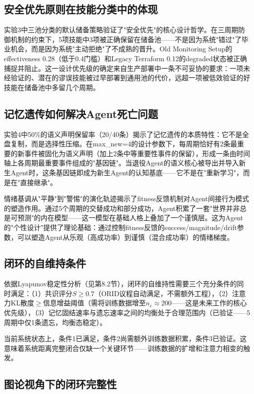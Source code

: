 \documentclass[12pt,a4paper]{ctexart}
\begin{document}
\subsection{安全优先原则在技能分类中的体现}

实验3中三池分类的默认储备策略验证了"安全优先"的核心设计哲学。在三周期防御机制的约束下，5项技能中3项被正确保留在储备池——不是因为系统"错过"了毕业机会，而是因为系统"主动拒绝"了不成熟的晋升。Old Monitoring Setup的effectiveness 0.28（低于0.4门槛）和Legacy Terraform 0.12的degraded状态被正确捕捉并阻止。这一设计优先级的确定来自生产部署中一条不可妥协的要求：一项未经验证的、潜在的谬误技能被过早部署到通用池的代价，远超一项被低效验证的好技能在储备池中多留几个周期。

\subsection{记忆遗传如何解决Agent死亡问题}

实验4中50\%的语义声明保留率（20/40条）揭示了记忆遗传的本质特性：它不是全盘复制，而是选择性压缩。在max\_new=4的设计参数下，每周期恰好有2条最重要的新事件被固化为语义声明（加上2条中等重要性事件的保留），形成一条由时间轴上各周期最重要事件组成的"基因链"。当退役Agent的语义核心被导出并导入新生Agent时，这条基因链即成为新生Agent的认知基底——它不是在"重新学习"，而是在"直接继承"。

情绪基调从"平静"到"警惕"的演化轨迹揭示了fitness反馈机制对Agent间接行为模式的塑造作用。通过5个周期的交替成功和部分成功，Agent积累了一套"世界并非总是可预测"的内在模型——这一模型在基础人格上叠加了一个谨慎层。这为Agent的"个性设计"提供了理论基础：通过控制fitness反馈的success/magnitude/drift参数，可以塑造Agent从乐观（高成功率）到谨慎（混合成功率）的情绪梯度。

\subsection{闭环的自维持条件}

依据Lyapunov稳定性分析（见第8.2节），闭环的自维持性需要三个充分条件的同时满足：（1）共识评分$S \geq 0.7$（ORID议程自动满足，不需额外工程），（2）注意力KL散度$\geq$信息增益阈值（需将训练数据增至$n_c \approx 200$——这是未来工作的核心优先级），（3）记忆固结速率与遗忘速率之间的均衡处于合理范围内（已验证——5周期中仅1条遗忘，均衡态稳定）。

当前系统状态上，条件1已满足，条件2尚需额外训练数据积累，条件3已验证。这意味着系统距离完整闭合仅缺一个关键环节——训练数据的扩增和注意力相变的触发。

\subsection{图论视角下的闭环完整性}
\end{document}

